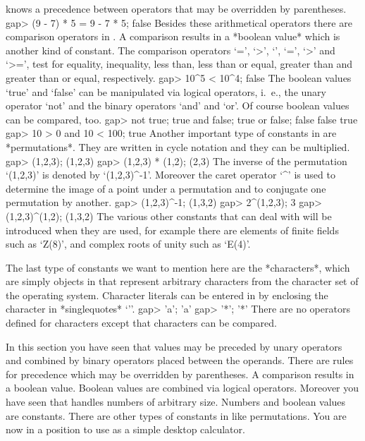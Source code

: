 {\GAP}  knows a  precedence  between operators that may be overridden  by
parentheses.
\beginexample
gap> (9 - 7) * 5 = 9 - 7  * 5;
false
\endexample
Besides these arithmetical operators there are comparison operators in
{\GAP}. A comparison results  in a  *boolean  value* which is  another
kind  of constant.  The comparison  operators `=', `\<>', `\<', `\<=',
`>' and `>=',  test for equality, inequality,  less than, less than or
equal, greater than and greater than or equal, respectively.
\beginexample
gap> 10^5 < 10^4;
false
\endexample
The boolean values  `true' and   `false'  can be  manipulated via logical
operators, i.~e., the unary operator `not' and the binary operators `and'
and `or'.  Of course boolean values can be compared, too.
\beginexample
gap> not true; true and false; true or false;
false
false
true
gap> 10 > 0 and 10 < 100;
true
\endexample
Another important  type of constants in   {\GAP} are *permutations*. They
are written in cycle notation and they can be multiplied.
\beginexample
gap> (1,2,3);
(1,2,3)
gap> (1,2,3) * (1,2);
(2,3)
\endexample
The inverse of the   permutation  `(1,2,3)' is denoted   by `(1,2,3)^-1'.
Moreover the caret operator `^' is used to determine the image of a point
under a permutation and to conjugate one permutation by another.
\beginexample
gap> (1,2,3)^-1;
(1,3,2)
gap> 2^(1,2,3);
3
gap> (1,2,3)^(1,2);
(1,3,2)
\endexample
The various other constants that {\GAP} can deal with will be introduced
when they are used, for example there are elements of finite fields
such as `Z(8)', and complex roots of unity such as `E(4)'.

The    last  type  of   constants  we  want  to mention    here are the
*characters*, which are simply objects in {\GAP} that represent arbitrary
characters  from  the character set   of the  operating system. Character
literals can  be  entered   in  {\GAP} by  enclosing  the   character  in
*singlequotes* `{'}'.
\beginexample
gap> 'a';
'a'
gap> '*';
'*'
\endexample
There are no  operators defined for characters except that characters can
be compared.

In this  section you  have  seen that values  may  be preceded  by  unary
operators  and combined by  binary operators placed between the operands.
There are rules for precedence which may be overridden by parentheses.  A
comparison  results in a boolean value.   Boolean values are combined via
logical operators.  Moreover you have seen that {\GAP} handles numbers of
arbitrary size.   Numbers and boolean   values are constants.   There are
other types of  constants in {\GAP} like permutations.   You are now in a
position to use {\GAP} as a simple desktop calculator.

